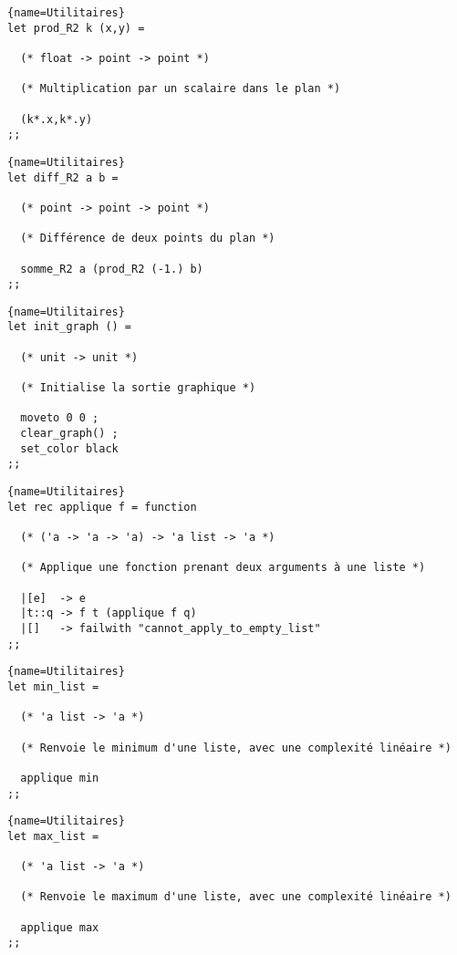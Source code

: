 \documentclass[10pt,twoside,a4paper]{article}
\begin{document}
\begin{lstlisting}{name=Utilitaires}
let prod_R2 k (x,y) =

  (* float -> point -> point *)

  (* Multiplication par un scalaire dans le plan *)
  
  (k*.x,k*.y)
;;
\end{lstlisting}
\pagebreak
\begin{lstlisting}{name=Utilitaires}
let diff_R2 a b =

  (* point -> point -> point *)

  (* Différence de deux points du plan *)
  
  somme_R2 a (prod_R2 (-1.) b)
;;
\end{lstlisting}

\begin{lstlisting}{name=Utilitaires}
let init_graph () =

  (* unit -> unit *)

  (* Initialise la sortie graphique *)
  
  moveto 0 0 ;
  clear_graph() ;
  set_color black
;;
\end{lstlisting}

\begin{lstlisting}{name=Utilitaires}
let rec applique f = function

  (* ('a -> 'a -> 'a) -> 'a list -> 'a *)

  (* Applique une fonction prenant deux arguments à une liste *)

  |[e]  -> e
  |t::q -> f t (applique f q)
  |[]   -> failwith "cannot_apply_to_empty_list"
;;
\end{lstlisting}

\begin{lstlisting}{name=Utilitaires}
let min_list =

  (* 'a list -> 'a *)

  (* Renvoie le minimum d'une liste, avec une complexité linéaire *)

  applique min
;;
\end{lstlisting}

\begin{lstlisting}{name=Utilitaires}
let max_list =

  (* 'a list -> 'a *)

  (* Renvoie le maximum d'une liste, avec une complexité linéaire *)

  applique max
;;
\end{lstlisting}
\end{document}
